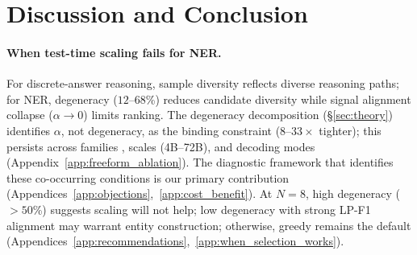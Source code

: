 \section{Discussion and Conclusion}\label{sec:discussion}\label{sec:selection_method}\label{sec:conclusion}

\paragraph{When test-time scaling fails for NER.}
For discrete-answer reasoning, sample diversity reflects diverse reasoning paths; for NER, degeneracy ($12$--$68$\%) reduces candidate diversity while signal alignment collapse ($\alpha{\to}0$) limits ranking.
The degeneracy decomposition (\S\ref{sec:theory}) identifies $\alpha$, not degeneracy, as the binding constraint ($8$--$33{\times}$ tighter); this persists across families \cite{yun2025price}, scales (4B--72B), and decoding modes (Appendix~\ref{app:freeform_ablation}).
The diagnostic framework that identifies these co-occurring conditions is our primary contribution (Appendices~\ref{app:objections},~\ref{app:cost_benefit}).
At $N{=}8$, high degeneracy ($>50$\%) suggests scaling will not help; low degeneracy with strong LP-F1 alignment may warrant entity construction; otherwise, greedy remains the default (Appendices~\ref{app:recommendations},~\ref{app:when_selection_works}).
